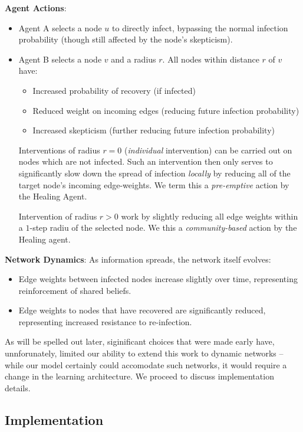 \documentclass[12pt]{article}
\begin{document}
\textbf{Agent Actions}: 
\begin{itemize}
    \item Agent A selects a node $u$ to directly infect, bypassing the normal infection probability (though still affected by the node's skepticism).
    \item Agent B selects a node $v$ and a radius $r$. All nodes within distance $r$ of $v$ have:
    \begin{itemize}
        \item Increased probability of recovery (if infected)
        \item Reduced weight on incoming edges (reducing future infection probability)
        \item Increased skepticism (further reducing future infection probability)
    \end{itemize}

    Interventions of radius $r = 0$ (\textit{individual} intervention) can be carried out on nodes which are not infected. Such an intervention then only serves 
    to significantly slow down the spread of infection \textit{locally} by reducing all of the target node's incoming edge-weights. We term this a \emph{pre-emptive} 
    action by the Healing Agent. 

    Intervention of radius $r > 0$ work by slightly reducing 
    all edge weights within a $1$-step radiu of the selected node. We this a \emph{community-based} action by the Healing agent. 
\end{itemize}

\textbf{Network Dynamics}: As information spreads, the network itself evolves:
\begin{itemize}
    \item Edge weights between infected nodes increase slightly over time, representing reinforcement of shared beliefs.
    \item Edge weights to nodes that have recovered are significantly reduced, representing increased resistance to re-infection.
\end{itemize}

As will be spelled out later, siginificant choices that were made early have, unnforunately, limited our ability to extend this work to dynamic networks -- while our model certainly could accomodate such networks, it would require
a change in the learning architecture. We proceed to discuss 
implementation details. 

\subsection{Implementation}
\end{document}
